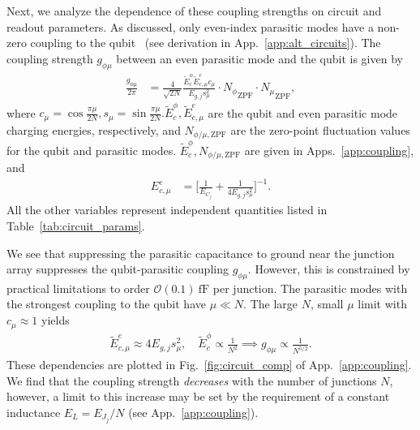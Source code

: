 \documentclass[%
reprint,
superscriptaddress,
 amsmath,amssymb,
 aps,
 prx,
longbibliography,
floatfix,
]{revtex4-2}
\newcommand{\singh}[1]{{\color{orange}{{}#1}}}%
\newcommand{\AC}[1]{{\color{blue}{{}[AC: #1]}}}
\begin{document}
Next, we analyze the dependence of these coupling strengths on circuit and readout parameters. As discussed, only even-index parasitic modes have a non-zero coupling to the qubit~\cite{viola2015collective} (see derivation in App.~\ref{app:alt_circuits}). The coupling strength $g_{\phi \mu}$ between an even parasitic mode and the qubit is given by
\begin{align}
\frac{g_{\phi\mu}}{2\pi}&=\frac{4}{\sqrt{2N}} \frac{\tilde{E}^\phi_c\tilde{E}^e_{c,\mu}c_\mu}{E_{g,j}s_\mu^2}     \cdot {N_\phi}_{\mathrm{ZPF}} \cdot {N_\mu}_{\mathrm{ZPF}},
\end{align}
where $c_\mu=\cos{\frac{\pi\mu}{2N}},s_\mu = \sin \frac{\pi \mu}{2N}.\tilde{E}_c^\phi,\tilde{E}^e_{c,\mu} $ are the qubit and even parasitic mode charging energies, respectively, and $N_{\phi/\mu,\mathrm{ZPF}}$ are the zero-point fluctuation values for the qubit and parasitic modes. $\tilde{E}_c^\phi,N_{\phi/\mu,\mathrm{ZPF}}$ are given in Apps.~\ref{app:coupling}, and
\begin{align}
E_{c,\mu}^e&=\Big[\frac{1}{E_{C_j}}+\frac{1}{4E_{g,j}s_\mu^2}\Big]^{-1}.\label{eq:parasitic}
\end{align}
All the other variables represent independent quantities listed in Table~\ref{tab:circuit_params}. 

We see that  suppressing the parasitic capacitance to ground near the junction array suppresses the qubit-parasitic coupling $g_{\phi\mu}$. However, this is constrained by practical limitations to order $\mathcal{O}(0.1) \ \mathrm{fF}$  per junction. The parasitic modes with the strongest coupling to the qubit have $\mu\ll N$. The large $N$, small $\mu$ limit with $c_\mu\approx 1$ yields
\begin{align}
    \tilde{E}^e_{c,\mu}\approx 4E_{g,j}s_\mu^2, \quad \tilde{E}^\phi_c\propto \frac{1}{N^2}\implies g_{\phi\mu}\propto \frac{1}{N^{5/2}}.\label{eq:dep1}
\end{align}
These dependencies are plotted in Fig.~\ref{fig:circuit_comp} of App.~\ref{app:coupling}. We find that the coupling strength \textit{decreases} with the number of junctions $N$, however, a limit to this increase may be set by the requirement of a constant inductance $E_L=E_{J_j}/N$ (see App.~\ref{app:coupling}). 
\end{document}
